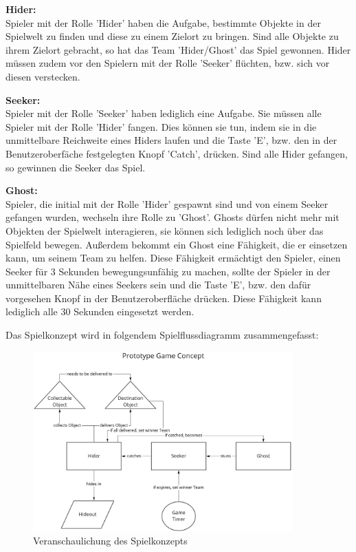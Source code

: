\textbf{Hider:} \\
Spieler mit der Rolle 'Hider' haben die Aufgabe, bestimmte Objekte in der Spielwelt zu finden und diese zu einem Zielort zu bringen. Sind alle Objekte zu ihrem Zielort gebracht, so hat das Team 'Hider/Ghost' das Spiel gewonnen. Hider müssen zudem vor den Spielern mit der Rolle 'Seeker' flüchten, bzw. sich vor diesen verstecken. 

\textbf{Seeker:} \\
Spieler mit der Rolle 'Seeker' haben lediglich eine Aufgabe. Sie müssen alle Spieler mit der Rolle 'Hider' fangen. Dies können sie tun, indem sie in die unmittelbare Reichweite eines Hiders laufen und die Taste 'E', bzw. den in der Benutzeroberfäche festgelegten Knopf 'Catch', drücken. Sind alle Hider gefangen, so gewinnen die Seeker das Spiel.

\textbf{Ghost:} \\
Spieler, die initial mit der Rolle 'Hider' gespawnt sind und von einem Seeker gefangen wurden, wechseln ihre Rolle zu 'Ghost'. Ghosts dürfen nicht mehr mit Objekten der Spielwelt interagieren, sie können sich lediglich noch über das Spielfeld bewegen. Außerdem bekommt ein Ghost eine Fähigkeit, die er einsetzen kann, um seinem Team zu helfen. Diese Fähigkeit ermächtigt den Spieler, einen Seeker für 3 Sekunden bewegungsunfähig zu machen, sollte der Spieler in der unmittelbaren Nähe eines Seekers sein und die Taste 'E', bzw. den dafür vorgesehen Knopf in der Benutzeroberfläche drücken. Diese Fähigkeit kann lediglich alle 30 Sekunden eingesetzt werden.

Das Spielkonzept wird in folgendem Spielflussdiagramm zusammengefasst:

\begin{figure}[H]
	\centering
	\includegraphics[width=100mm]{images/game_concept.jpg}
	\caption[Spielkonzept Diagramm]{Veranschaulichung des Spielkonzepts}
	\label{pic:game_concept}
\end{figure}


